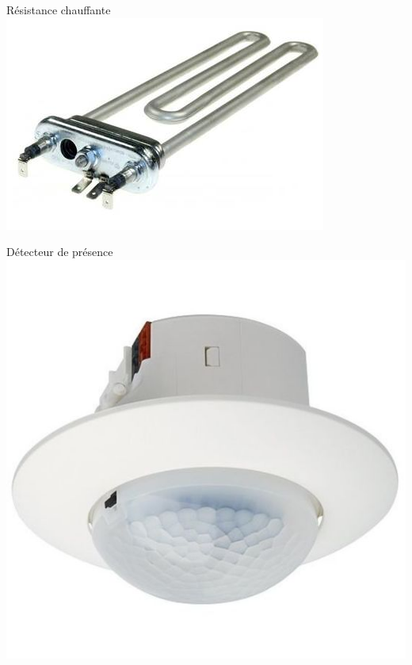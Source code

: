 \begin{UPSTIactivite}
\begin{minipage}[b]{0.24\textwidth}

\end{minipage}

\vspace*{0.5cm}

\begin{minipage}[b]{0.24\textwidth}
\centering
  Résistance chauffante
  \includegraphics[width=\textwidth,height=.15\textheight,keepaspectratio]{images/resistanceChauffante}


\end{minipage}
\begin{minipage}[b]{0.24\textwidth}
\centering
  Détecteur de présence
  \includegraphics[width=\textwidth,height=.15\textheight,keepaspectratio]{images/detecteurPresence}


\end{minipage}
\end{UPSTIactivite}
